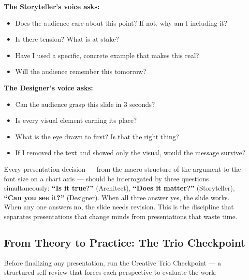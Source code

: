 \textbf{The Storyteller's voice asks:}
\begin{itemize}
  \item Does the audience care about this point? If not, why am I including it?
  \item Is there tension? What is at stake?
  \item Have I used a specific, concrete example that makes this real?
  \item Will the audience remember this tomorrow?
\end{itemize}

\textbf{The Designer's voice asks:}
\begin{itemize}
  \item Can the audience grasp this slide in 3 seconds?
  \item Is every visual element earning its place?
  \item What is the eye drawn to first? Is that the right thing?
  \item If I removed the text and showed only the visual, would the message survive?
\end{itemize}

\begin{thesisbox}
Every presentation decision --- from the macro-structure of the argument to the font size on a chart axis --- should be interrogated by three questions simultaneously: \textbf{``Is it true?''} (Architect), \textbf{``Does it matter?''} (Storyteller), \textbf{``Can you see it?''} (Designer). When all three answer yes, the slide works. When any one answers no, the slide needs revision. This is the discipline that separates presentations that change minds from presentations that waste time.
\end{thesisbox}

\subsection{From Theory to Practice: The Trio Checkpoint}

Before finalizing any presentation, run the Creative Trio Checkpoint --- a structured self-review that forces each perspective to evaluate the work:

